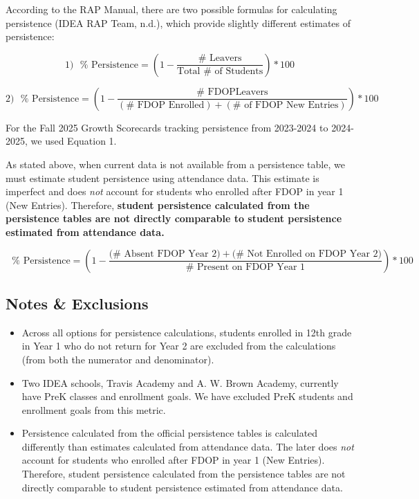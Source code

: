 \documentclass[
  letterpaper,
  DIV=11,
  numbers=noendperiod]{scrreprt}
\providecommand{\tightlist}{%
  \setlength{\itemsep}{0pt}\setlength{\parskip}{0pt}}
\begin{document}
According to the RAP Manual, there are two possible formulas for
calculating persistence (IDEA RAP Team, n.d.), which provide slightly
different estimates of persistence:

\[
1)\text{ } \% \text{ Persistence} = \left(1-\frac{\# \text{ Leavers}}{\text{Total } \# \text{ of Students}}\right)*100 
\]

\[
2)\text{ } \% \text{ Persistence} = \left(1-\frac{\# \text{ FDOPLeavers}}{(\# \text{ FDOP Enrolled}) + (\# \text{ of FDOP New Entries})}\right)*100
\]

For the Fall 2025 Growth Scorecards tracking persistence from 2023-2024
to 2024-2025, we used Equation 1.

As stated above, when current data is not available from a persistence
table, we must estimate student persistence using attendance data. This
estimate is imperfect and does \emph{not} account for students who
enrolled after FDOP in year 1 (New Entries). Therefore, \textbf{student
persistence calculated from the persistence tables are not directly
comparable to student persistence estimated from attendance data.}

\[
\text{ } \% \text{ Persistence} = \left(1 - \frac{(\# \text{ Absent FDOP Year 2)} + (\#\text{ Not Enrolled on FDOP Year 2)}}{\# \text{ Present on FDOP Year 1}}\right)*100
\]

\subsection{Notes \& Exclusions}\label{notes-exclusions-8}

\begin{itemize}
\tightlist
\item
  Across all options for persistence calculations, students enrolled in
  12th grade in Year 1 who do not return for Year 2 are excluded from
  the calculations (from both the numerator and denominator).
\item
  Two IDEA schools, Travis Academy and A. W. Brown Academy, currently
  have PreK classes and enrollment goals. We have excluded PreK students
  and enrollment goals from this metric.
\item
  Persistence calculated from the official persistence tables is
  calculated differently than estimates calculated from attendance data.
  The later does \emph{not} account for students who enrolled after FDOP
  in year 1 (New Entries). Therefore, student persistence calculated
  from the persistence tables are not directly comparable to student
  persistence estimated from attendance data.
\end{itemize}
\end{document}
